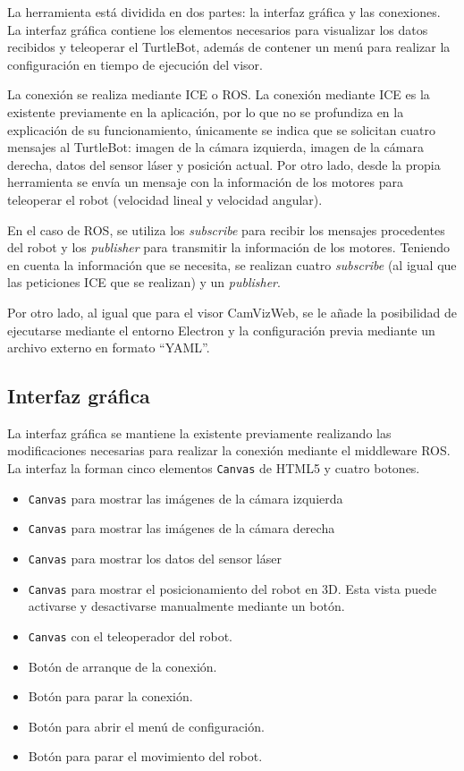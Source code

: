 La herramienta está dividida en dos partes: la interfaz gráfica y las conexiones. La interfaz gráfica contiene los elementos necesarios para visualizar los datos recibidos y teleoperar el TurtleBot, además de contener un menú para realizar la configuración en tiempo de ejecución del visor.

La conexión se realiza mediante ICE o ROS. La conexión mediante ICE es la existente previamente en la aplicación, por lo que no se profundiza en la explicación de su funcionamiento, únicamente se indica que se solicitan cuatro mensajes al TurtleBot: imagen de la cámara izquierda, imagen de la cámara derecha, datos del sensor láser y posición actual. Por otro lado, desde la propia herramienta se envía un mensaje con la información de los motores para teleoperar el robot (velocidad lineal y velocidad angular).

En el caso de ROS, se utiliza los \textit{subscribe} para recibir los mensajes procedentes del robot y los \textit{publisher} para transmitir la información de los motores. Teniendo en cuenta la información que se necesita, se realizan cuatro \textit{subscribe} (al igual que las peticiones ICE que se realizan) y un \textit{publisher}.

Por otro lado, al igual que para el visor CamVizWeb, se le añade la posibilidad de ejecutarse mediante el entorno Electron y la configuración previa mediante un archivo externo en formato ``YAML''.

\subsection{Interfaz gráfica}
La interfaz gráfica se mantiene la existente previamente realizando las modificaciones necesarias para realizar la conexión mediante el middleware ROS. La interfaz la forman cinco elementos \texttt{Canvas} de HTML5 y cuatro botones.
\begin{itemize}
\item \texttt{Canvas} para mostrar las imágenes de la cámara izquierda
\item \texttt{Canvas} para mostrar las imágenes de la cámara derecha
\item \texttt{Canvas} para mostrar los datos del sensor láser
\item \texttt{Canvas} para mostrar el posicionamiento del robot en 3D. Esta vista puede activarse y desactivarse manualmente mediante un botón.
\item \texttt{Canvas} con el teleoperador del robot.
\item Botón de arranque de la conexión.
\item Botón para parar la conexión.
\item Botón para abrir el menú de configuración.
\item Botón para parar el movimiento del robot.
\end{itemize}

